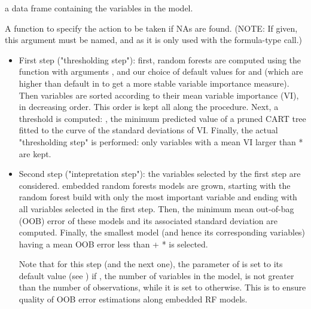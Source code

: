 \documentclass[11pt]{article}
\begin{document}
\begin{Arguments}
\begin{ldescription}
\item[\code{data}] a data frame containing the variables in the model.

\item[\code{na.action}] A function to specify the action to be taken if NAs are
found.  (NOTE: If given, this argument must be named, and as
 it is only used with the formula-type call.)
\end{ldescription}
\end{Arguments}
%
\begin{Details}\relax
\begin{itemize}
 \item First step ("thresholding step"): first, 
random forests are computed using the function  with
arguments , and our choice of default values for 
 and  (which are higher than default in
 to get a more stable variable importance measure).
Then variables are sorted according to their mean variable importance (VI),
in decreasing order.  This order is kept all along the procedure.
Next, a threshold is computed:
, the minimum predicted value of a pruned CART tree fitted
to the curve of the standard deviations of VI.  Finally, the actual
"thresholding step" is performed: only variables with a mean VI larger than
 *  are kept.

\item Second step ("intepretation step"): the variables selected by the
first step are considered.  embedded random forests models
are grown, starting with the random forest build with only the most
important variable and ending with all variables selected in the first step.
Then,  the minimum mean out-of-bag (OOB) error of these models
and its associated standard deviation  are computed.  Finally,
the smallest model (and hence its corresponding variables) having a mean OOB
error less than  +  *  is selected.

Note that for this step (and the next one),
the  parameter of  is set to its default value
(see ) if , the number of variables
in the model, is not greater than the number of observations,
while it is set to  otherwise. This is to ensure quality of OOB
error estimations along embedded RF models.


\end{itemize}
\end{Details}
\end{document}
